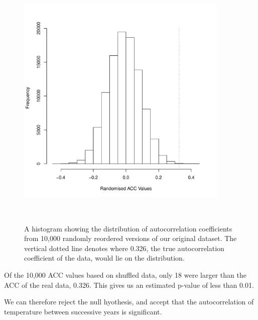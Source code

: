 \documentclass[12pt]{article}
\begin{document}
\begin{figure}[hbp!]
\centering
\includegraphics[width = 4in, height = 5in]{../data/ACC_Hist.pdf}
\caption{A histogram showing the distribution of autocorrelation 
coefficients from 10,000 randomly reordered versions of our original dataset. 
The vertical dotted line denotes where 0.326, the true autocorrelation
coefficient of the data, would lie on the distribution.} 
\label{fig:Figure 2}
\end{figure}

\vspace{10mm} 

Of the 10,000 ACC values based on shuffled data, only 18 were larger than 
the ACC of the real data, 0.326. This gives us an estimated p-value of less than 
0.01.

We can therefore reject the null hyothesis, and accept that the autocorrelation 
of temperature between successive years is significant. 
\end{document}
